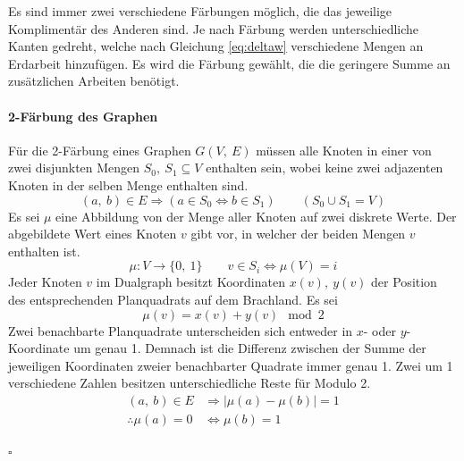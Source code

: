 \documentclass[a4paper, 12pt]{scrartcl}
\begin{document}
Es sind immer zwei verschiedene Färbungen möglich, die das jeweilige Komplimentär des Anderen sind. Je nach Färbung werden unterschiedliche Kanten gedreht, welche nach Gleichung \eqref{eq:deltaw} verschiedene Mengen an Erdarbeit hinzufügen. Es wird die Färbung gewählt, die die geringere Summe an zusätzlichen Arbeiten benötigt.
\paragraph{2-Färbung des Graphen}
\label{par:faerbung}
Für die 2-Färbung eines Graphen $G(V,\ E)$ müssen alle Knoten in einer von zwei disjunkten Mengen $S_0,\ S_1 \subseteq V$ enthalten sein, wobei keine zwei adjazenten Knoten in der selben Menge enthalten sind.
\[ (a,\ b) \in E \Rightarrow (a \in S_0 \Leftrightarrow b \in S_1) \qquad (S_0 \cup S_1 = V)\]
Es sei $\mu$ eine Abbildung von der Menge aller Knoten auf zwei diskrete Werte. Der abgebildete Wert eines Knoten $v$ gibt vor, in welcher der beiden Mengen $v$ enthalten ist.
\[ \mu : V \rightarrow \{0,\ 1\} \qquad v \in S_i \Leftrightarrow \mu(V) = i \]
Jeder Knoten $v$ im Dualgraph besitzt Koordinaten $x(v),\ y(v)$ der Position des entsprechenden Planquadrats auf dem Brachland. Es sei
\begin{equation}
	\mu(v) = x(v) + y(v) \mod 2 \label{eq:abbildung}
\end{equation}
Zwei benachbarte Planquadrate unterscheiden sich entweder in $x$- oder $y$-Koordinate um genau 1. Demnach ist die Differenz zwischen der Summe der jeweiligen Koordinaten zweier benachbarter Quadrate immer genau 1. Zwei um 1 verschiedene Zahlen besitzen unterschiedliche Reste für Modulo 2.
\begin{align*}
	(a,\ b) \in E &\Rightarrow \left|\mu(a) - \mu(b)\right| = 1 \\
	\therefore \mu(a) = 0 &\Leftrightarrow \mu(b) = 1
\end{align*}
\begin{flushright}
	\Large$\square$
\end{flushright}
\end{document}

